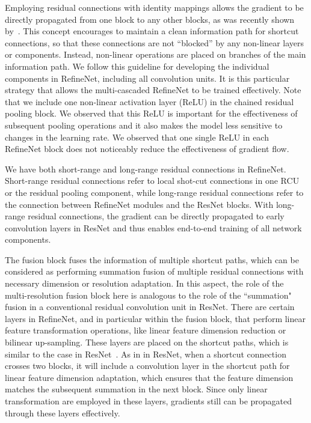 \documentclass[10pt,twocolumn,letterpaper]{article}
\begin{document}
Employing residual connections with identity mappings allows the gradient to be directly propagated from one block to any other blocks, as was recently shown by~\cite{he2016identity}.  This concept encourages to maintain a clean information path for shortcut connections,
so that these connections are not ``blocked'' by any non-linear layers or components. Instead, non-linear operations are placed on branches of the main information path.
We follow this guideline for developing the individual components in RefineNet, including all convolution units.
It is this particular strategy that allows the multi-cascaded RefineNet to be trained effectively.
Note that we include one non-linear activation layer (ReLU) in the chained residual pooling block. We observed that this ReLU is important for the effectiveness of subsequent pooling operations and it also makes the model less sensitive to changes in the learning rate. We observed that one single ReLU in each RefineNet block does not noticeably reduce the effectiveness of gradient flow.


We have both short-range and long-range residual connections in RefineNet.
Short-range residual connections refer to local shot-cut connections in one RCU or the residual pooling component,
while long-range residual connections refer to the connection between RefineNet modules and the ResNet blocks.
With long-range residual connections,
the gradient can be directly propagated to early convolution layers in ResNet and thus enables end-to-end training of all network components. 


The fusion block fuses the information of multiple shortcut paths, which can be considered as performing summation fusion of multiple residual connections with necessary dimension or resolution adaptation. In this aspect, the role of the multi-resolution fusion block here is analogous to the role of the ``summation" fusion in a conventional residual convolution unit in ResNet.
There are certain layers in RefineNet, and in particular within the fusion block, that perform linear feature transformation operations, like linear feature dimension 
reduction or bilinear up-sampling.
These layers are placed on the shortcut paths,
which is similar to the case in ResNet~\cite{He:2016:ResNet}. 
As in in ResNet, when a shortcut connection crosses two blocks, it will include a convolution layer in the shortcut path for linear feature dimension adaptation, 
which ensures that the feature dimension matches the subsequent summation in the next block. 
Since only linear transformation are employed in these layers, gradients still can be propagated through these layers effectively.
\end{document}
